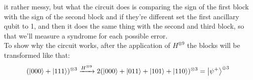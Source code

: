 \documentclass{article}
\begin{document}
	\begin{figure}[H]
	\centering
	\end{figure}
	\noindent it rather messy, but what the circuit does is comparing the sign of the first block with the sign of the second block and if they're different set the first ancillary qubit to 1, and then it does the same thing with the second and third block, so that we'll measure a syndrome for each possible error.\\
	To show why the circuit works, after the application of $H^{\otimes 9}$ the blocks will be transformed like that:
	\[  (\ket{000} + \ket{111})^{\otimes 3} \xrightarrow{H^{\otimes 9}} 2(\ket{000} + \ket{011} + \ket{101} + \ket{110})^{\otimes 3} = \ket{\psi^+}^{\oplus 3}\]
\end{document}
